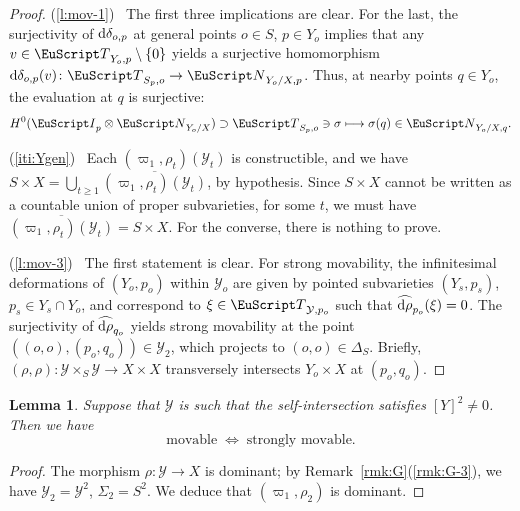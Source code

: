 \documentclass[10pt,a4paper]{article}
\numberwithin{equation}{section}
\newtheorem{m-lemma}[m-theorem]{Lemma}
\theoremstyle{definition}
\theoremstyle{remark}
\let\euf\EuScript %
\let\cal\mathcal
\let\dta\delta
\let\ges\geqslant
\let\sm\setminus
\let\vpi\varpi
\newcommand{\eI}{{\euf I}}
\newcommand{\rd}{{\rm d}}
\newcommand{\eN}{{\euf N}}
\newcommand{\eT}{{\euf T}}
\newcommand{\cY}{{\cal Y}}
\newcommand{\XX}{X}
\newcommand{\YY}{Y}
\begin{document}
\begin{proof}
 (\ref{l:mov-1})~  The first three implications are clear. For the last, the surjectivity of $\rd\dta_{o,p}$ at general points $o\in S$, $p\in\YY_o$ implies that any $v\in\eT_{\YY_o,p}\sm\{0\}$ yields a surjective homomorphism $\rd\dta_{o,p}(v)\colon \eT_{S_p,o}\to\eN_{\YY_o/\XX,p}$. Thus, at nearby points $q\in\YY_o$, the evaluation at $q$ is surjective:  
  \[
  H^0(\eI_p\otimes\eN_{\YY_o/\XX})\supset\eT_{S_p,o}\ni\sigma\longmapsto\sigma(q)\in\eN_{\YY_o/\XX,q}.
  \]
  
(\ref{iti:Ygen})~ Each $(\vpi_1,\rho_t)(\cY_t)$ is constructible, and we have 
$S\times\XX={\bigcup}_{t\ges 1} \overline{(\vpi_1,\rho_t)(\cY_t)}$, by hypothesis.  Since $S\times\XX$ cannot be written as a countable union of proper subvarieties, for some $t$, we must have $\overline{(\vpi_1,\rho_t)(\cY_t)}=S\times\XX$. For the converse, there is nothing to prove.

(\ref{l:mov-3})~  The first statement is clear. For strong movability, the infinitesimal deformations of $(\YY_o,p_o)$ within $\cY_o$ are given by pointed subvarieties $(\YY_s,p_s)$, $p_s\in\YY_s\cap\YY_o$, and correspond to $\xi\in\eT_{\cY, p_o}$ such that $\widehat{\rd\rho}_{p_o}(\xi)=0$. The surjectivity of $\widehat{\rd\rho}_{q_o}$ yields  strong movability at the point $((o,o),(p_o,q_o))\in\cY_2$, which projects to $(o,o)\in\Delta_S$. Briefly, $(\rho,\rho)\colon \cY\times_S\cY\to\XX\times\XX$ transversely intersects  $Y_o\times\XX$ at $(p_o,q_o)$. 
\end{proof}

\begin{m-lemma}\label{lm:conn-mov}
Suppose that $\cY$ is such that the self-intersection satisfies $[Y]^2\neq0$. Then we have 
\[
\text{movable}\;\;\Longleftrightarrow\;\;\text{strongly movable.}
\] 
\end{m-lemma}

\begin{proof}
The morphism $\rho\colon \cY\to\XX$ is dominant; by Remark~\ref{rmk:G}(\ref{rmk:G-3}), we have $\cY_2=\cY^2$, $\Sigma_2=S^2$. We deduce that $(\vpi_1,\rho_2)$ is dominant.
\end{proof}
\end{document}
